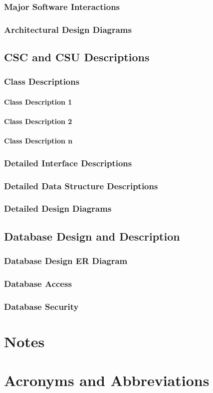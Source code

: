 \documentclass[11pt,a4paper,titlepage]{article}
\begin{document}
\subsubsection{Major Software Interactions}
\subsubsection{Architectural Design Diagrams}
\subsection{CSC and CSU Descriptions}
\subsubsection{Class Descriptions}
\paragraph{Class Description 1}
\paragraph{Class Description 2}
\paragraph{Class Description n}
\subsubsection{Detailed Interface Descriptions}
\subsubsection{Detailed Data Structure Descriptions}
\subsubsection{Detailed Design Diagrams}
\subsection{Database Design and Description}
\subsubsection{Database Design ER Diagram}
\subsubsection{Database Access}
\subsubsection{Database Security}

\section{Notes}
\section{Acronyms and Abbreviations}
\end{document}
